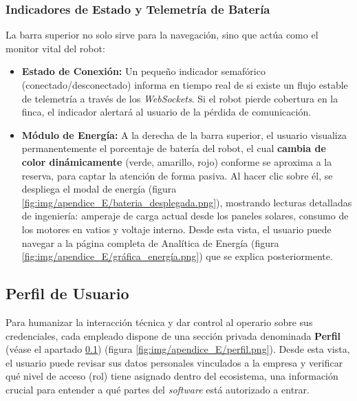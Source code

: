 \subsubsection{Indicadores de Estado y Telemetría de Batería}
La barra superior no solo sirve para la navegación, sino que actúa como el monitor vital del robot:
\begin{itemize}
    \item \textbf{Estado de Conexión:} Un pequeño indicador semafórico (conectado/desconectado) informa en tiempo real de si existe un flujo estable de telemetría a través de los \textit{WebSockets}. Si el robot pierde cobertura en la finca, el indicador alertará al usuario de la pérdida de comunicación.
    \item \textbf{Módulo de Energía:} A la derecha de la barra superior, el usuario visualiza permanentemente el porcentaje de batería del robot, el cual \textbf{cambia de color dinámicamente} (verde, amarillo, rojo) conforme se aproxima a la reserva, para captar la atención de forma pasiva. Al hacer clic sobre él, se despliega el modal de energía (figura \ref{fig:img/apendice_E/bateria_desplegada.png}), mostrando lecturas detalladas de ingeniería: amperaje de carga actual desde los paneles solares, consumo de los motores en vatios y voltaje interno. Desde esta vista, el usuario puede navegar a la página completa de Analítica de Energía (figura \ref{fig:img/apendice_E/gráfica_energía.png}) que se explica posteriormente.
\end{itemize}


\subsection{Perfil de Usuario}\label{sec:perfil}
Para humanizar la interacción técnica y dar control al operario sobre sus credenciales, cada empleado dispone de una sección privada denominada \textbf{Perfil} (véase el apartado \ref{sec:perfil}) (figura \ref{fig:img/apendice_E/perfil.png}). Desde esta vista, el usuario puede revisar sus datos personales vinculados a la empresa y verificar qué nivel de acceso (rol) tiene asignado dentro del ecosistema, una información crucial para entender a qué partes del \textit{software} está autorizado a entrar.


